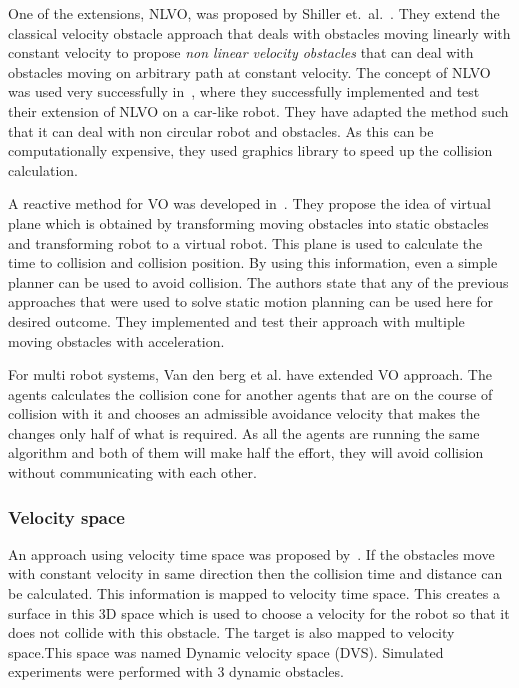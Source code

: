 One of the extensions, NLVO, was proposed by Shiller et.\ al.~\cite{shiller2001motion}. They extend the classical velocity obstacle approach that deals with obstacles moving linearly with constant velocity to propose \textit{non linear velocity obstacles} that can deal with obstacles moving on arbitrary path at constant velocity.
The concept of NLVO was used very successfully in~\cite{large2005navigation}, where they successfully implemented and test their extension of NLVO on a car-like robot. They have adapted the method such that it can deal with non circular robot and obstacles. As this can be computationally expensive, they used graphics library to speed up the collision calculation.

A reactive method for VO was developed in~\cite{belkhouche2009reactive}. They propose the idea of virtual plane which is obtained by transforming moving obstacles into static obstacles and transforming robot to a virtual robot. This plane is used to calculate the time to collision and collision position. By using this information, even a simple planner can be used to avoid collision. The authors state that any of the previous approaches that were used to solve static motion planning can be used here for desired outcome. They implemented and test their approach with multiple moving obstacles with acceleration.

For multi robot systems, Van den berg et al.\cite{van2008reciprocal}\cite{van2011reciprocal} have extended VO approach. The agents calculates the collision cone for another agents that are on the course of collision with it and chooses an admissible avoidance velocity that makes the changes only half of what is required. As all the agents are running the same algorithm and both of them will make half the effort, they will avoid collision without communicating with each other.

\subsubsection{Velocity space}%
\label{subsub:velocity_space}
An approach using velocity time space was proposed by~\cite{owen2005motion}\cite{owen2006a}. If the obstacles move with constant velocity in same direction then the collision time and distance can be calculated. This information is mapped to velocity time space. This creates a surface in this 3D space which is used to choose a velocity for the robot so that it does not collide with this obstacle. The target is also mapped to velocity space.This space was named Dynamic velocity space (DVS). Simulated experiments were performed with 3 dynamic obstacles.



